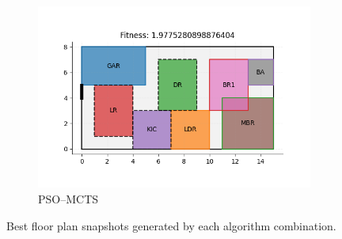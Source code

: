 \documentclass[]{article}
\begin{document}
\begin{figure}[ht]
\begin{subfigure}[b]{0.8\textwidth}
        \includegraphics[width=\textwidth]{images/1best_pso_mcts.png}
        \caption{PSO--MCTS}
    \end{subfigure}
    \caption{Best floor plan snapshots generated by each algorithm combination.}
    \label{fig:best-snapshots}
\end{figure}
\end{document}
